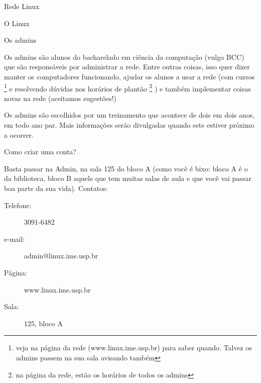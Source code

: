 \begin{secao}{Rede Linux}
\begin{subsecao}{O Linux}
\end{subsecao}

\begin{subsecao}{Os admins}

Os admins são alunos do bacharelado em ciência da computação (vulgo BCC) que
são responsáveis por administrar a rede. Entre outras coisas, isso quer dizer
manter os computadores funcionando, ajudar os alunos a usar a rede (com
cursos \footnote{veja na página da rede (www.linux.ime.usp.br) para saber
quando. Talvez os admins passem na sua sala avisando também} e resolvendo
dúvidas nos horários de plantão \footnote{na página da rede, estão os horários
de todos os admins}
) e também implementar coisas novas na rede (aceitamos sugestões!)

Os admins são escolhidos por um treinamento que acontece de dois em dois anos,
em todo ano par. Mais informações serão divulgadas quando este estiver próximo
a ocorrer.

\end{subsecao}
\begin{subsecao}{Como criar uma conta?}

Basta passar na Admin, na sala 125 do bloco A (como você é bixo: bloco A é o da
biblioteca, bloco B aquele que tem muitas salas de aula e que você vai passar boa 
parte da sua vida). Contatos:
\begin{description}

\item [Telefone:] 3091-6482
\item [e-mail:] admin@linux.ime.usp.br
\item [Página:] www.linux.ime.usp.br
\item [Sala:] 125, bloco A

\end{description}
\end{subsecao}
\end{secao}

